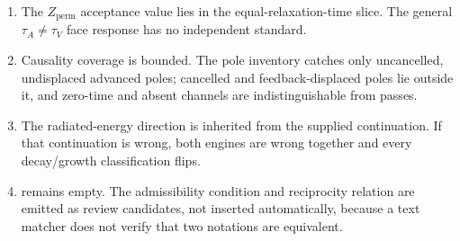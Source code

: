 \begin{enumerate}[leftmargin=2.2em]
\item The \(Z_{\mathrm{perm}}\) acceptance value lies in the
equal-relaxation-time slice. The general \(\tau_A\neq\tau_V\) face response has
no independent standard.

\item Causality coverage is bounded. The pole inventory catches only
uncancelled, undisplaced advanced poles; cancelled and feedback-displaced poles
lie outside it, and zero-time and absent channels are indistinguishable from
passes.

\item The radiated-energy direction is inherited from the supplied
continuation. If that continuation is wrong, both engines are wrong together
and every decay/growth classification flips.

\item {} remains empty. The admissibility condition and
reciprocity relation are emitted as review candidates, not inserted
automatically, because a text matcher does not verify that two notations are
equivalent.
\end{enumerate}
